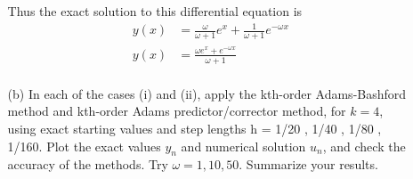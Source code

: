 \documentclass[11pt]{article}
\begin{document}
\begin{enumerate}
\begin{enumerate}
                Thus the exact solution to this differential equation is
                \begin{align*}
                    y(x) &= \frac{\omega}{\omega + 1} e^{x} + \frac{1}{\omega + 1}e^{-\omega x} \\
                    y(x) &= \frac{\omega e^x + e^{-\omega x}}{\omega + 1}\\
                \end{align*}

            \item[(b)]
                In each of the cases (i) and (ii), apply the kth-order Adams-Bashford method and
                kth-order Adams predictor/corrector method, for $k = 4$, using exact starting values and
                step lengths h = 1/20 , 1/40 , 1/80 , 1/160. 
                Plot the exact values $y_n$ and numerical solution $u_n$, and 
                check the accuracy of the methods.
                Try $\omega = 1, 10, 50$.
                Summarize your results.
        \end{enumerate}
\end{enumerate}
\end{document}
